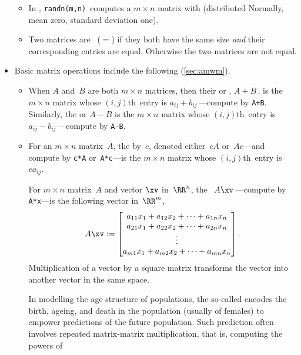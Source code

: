 \begin{itemize}
\begin{itemize}
\item In \script, \verb|randn(m,n)|~computes a \(m\times n\) matrix with  (distributed Normally, mean zero, standard deviation one).

\item Two matrices are ~(\(=\)) if they both have the same size \emph{and} their corresponding entries are equal.
Otherwise the two matrices are not equal.

\end{itemize}


\item Basic matrix operations include the following (\cref{sec:amwm}).
\begin{itemize}
\item When \(A\) and~\(B\) are both \(m\times n\) matrices, then their  or , \(A+B\)\,, is the \(m\times n\) matrix whose \((i,j)\)th~entry is \(a_{ij}+b_{ij}\)\,---compute by \verb|A+B|.  
Similarly,  the  or  \(A-B\) is the \(m\times n\) matrix whose \((i,j)\)th~entry is \(a_{ij}-b_{ij}\)\,---compute by \verb|A-B|.

\item For an \(m\times n\) matrix~\(A\), the  by~\(c\), denoted either~\(cA\) or~\(Ac\)---and compute by \verb|c*A| or~\verb|A*c|---is the \(m\times n\) matrix whose \((i,j)\)th~entry is~\(ca_{ij}\).

\itemhi For \(m\times n\) matrix~\(A\) and vector \(\xv\) in~\(\RR^n\), the ~\(A\xv\)\,---compute by \verb|A*x|---is the following vector in~\(\RR^m\),
\begin{equation*}
A\xv:=
\begin{bmatrix} a_{11}x_1+a_{12}x_2+\cdots+a_{1n}x_n
\\a_{21}x_1+a_{22}x_2+\cdots+a_{2n}x_n
\\\vdots
\\a_{m1}x_1+a_{m2}x_2+\cdots+a_{mn}x_n
\end{bmatrix}.
\end{equation*}
Multiplication of a vector by a square matrix transforms the vector into another vector in the same space.

\itemme In modelling the age structure of populations, the so-called  encodes the birth, ageing, and death in the population (usually of females) to empower predictions of the future population.
Such prediction often involves repeated matrix-matrix multiplication, that is, computing the powers of 


\end{itemize}
\end{itemize}
